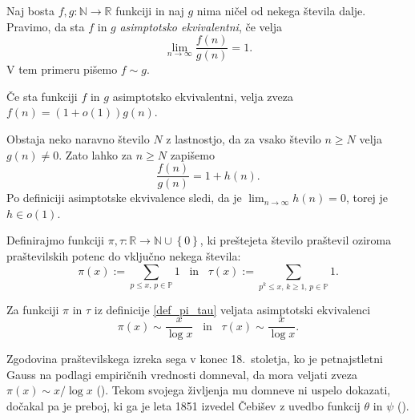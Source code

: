 \begin{definicija}
\label{def_asimptotska_ekvivalenca}
Naj bosta $f, g : \mathbb{N} \to  \mathbb{R}$ funkciji in naj $g$ nima ničel od nekega števila dalje. Pravimo, da sta $f$ in $g$ \emph{asimptotsko ekvivalentni}, če velja \begin{equation*}
\lim_{n \to \infty} \frac{f(n)}{g(n)} = 1.
\end{equation*}
V tem primeru pišemo $f \sim g$.
\end{definicija}
\begin{trditev}
Če sta funkciji $f$ in $g$ asimptotsko ekvivalentni, velja zveza $f(n) = (1 + o(1)) g(n)$.
\end{trditev}
\begin{dokaz}
Obstaja neko naravno število $N$ z lastnostjo, da za vsako število $n \ge N$ velja $g(n) \neq 0$. Zato lahko za $n \ge N$ zapišemo \begin{equation*}
\frac{f(n)}{g(n)} = 1 + h(n).
\end{equation*}  
Po definiciji asimptotske ekvivalence sledi, da je $\lim_{n \to \infty} h(n) = 0$, torej je $h \in o(1)$.  
\end{dokaz}

\begin{definicija}
\label{def_pi_tau}
Definirajmo funkciji $\pi, \tau : \mathbb{R} \to  \mathbb{N} \cup \left\{ 0\right\}$, ki preštejeta število praštevil oziroma praštevilskih potenc do vključno nekega števila: \begin{equation*}
\pi(x) :=  \sum_{p \le x, \, p \in \mathbb{P}} 1 \,\,\, \text{ in } \,\,\, \tau(x) :=  \sum_{p^{k} \le x, \, k \ge 1, \,   p \in \mathbb{P}} 1.
\end{equation*}  
\end{definicija}

\begin{izrek}
\label{izr_prastevilski_izrek}
 Za funkciji $\pi$ in $\tau$ iz definicije \ref{def_pi_tau} veljata asimptotski ekvivalenci \begin{equation*}
 \pi(x) \sim \frac{x}{\log x} \,\,\, \text{ in } \,\,\, \tau(x) \sim \frac{x}{\log x}.
 \end{equation*}  
\end{izrek}

Zgodovina praštevilskega izreka sega v konec 18.~stoletja, ko je petnajstletni Gauss na podlagi empiričnih vrednosti domneval, da mora veljati zveza $\pi(x) \sim x / \log x$ (\cite[str.~1]{mit_lecture_notes_2021}). Tekom svojega življenja mu domneve ni uspelo dokazati, dočakal pa je preboj, ki ga je leta
1851 izvedel Čebišev z uvedbo funkcij $\theta$ in $\psi$ (\cite[str.~4--5]{Granville_1993}). 

